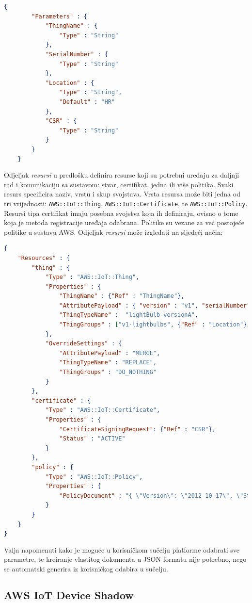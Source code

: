 \begin{lstlisting}[caption={Odjeljak \textit{parametri} u predlošku za registraciju}, language=json]
	{
		"Parameters" : {
			"ThingName" : {
				"Type" : "String"
			},
			"SerialNumber" : {
				"Type" : "String"
			},
			"Location" : {
				"Type" : "String",
				"Default" : "HR"
			},
			"CSR" : {
				"Type" : "String"    
			}
		}
	}
\end{lstlisting}

Odjeljak \textit{resursi} u predlošku definira resurse koji su potrebni uređaju za daljnji rad i komunikaciju sa sustavom: stvar, certifikat, jedna ili više politika. Svaki resurs specificira naziv, vrstu i skup svojstava. Vrsta resursa može biti jedna od tri vrijednosti: \lstinline|AWS::IoT::Thing|, \lstinline|AWS::IoT::Certificate|, te \lstinline|AWS::IoT::Policy|. Resursi tipa certifikat imaju posebna svojstva koja ih definiraju, ovisno o tome koja je metoda registracije uređaja odabrana. Politike su vezane za već postojeće politike u sustavu AWS. Odjeljak \textit{resursi} može izgledati na sljedeći način:

\begin{lstlisting}[caption={Odjeljak \textit{resursi} u predlošku za registraciju}, language=json]
{ 
	"Resources" : {
		"thing" : {
			"Type" : "AWS::IoT::Thing",
			"Properties" : {
				"ThingName" : {"Ref" : "ThingName"},
				"AttributePayload" : { "version" : "v1", "serialNumber" :  {"Ref" : "SerialNumber"}}, 
				"ThingTypeName" :  "lightBulb-versionA",
				"ThingGroups" : ["v1-lightbulbs", {"Ref" : "Location"}]
			},
			"OverrideSettings" : {
				"AttributePayload" : "MERGE",
				"ThingTypeName" : "REPLACE",
				"ThingGroups" : "DO_NOTHING"
			}
		},  
		"certificate" : {
			"Type" : "AWS::IoT::Certificate",
			"Properties" : {
				"CertificateSigningRequest": {"Ref" : "CSR"},
				"Status" : "ACTIVE"      
			}
		},
		"policy" : {
			"Type" : "AWS::IoT::Policy",
			"Properties" : {
				"PolicyDocument" : "{ \"Version\": \"2012-10-17\", \"Statement\": [{ \"Effect\": \"Allow\", \"Action\":[\"iot:Publish\"], \"Resource\": [\"arn:aws:iot:us-east-1:123456789012:topic/foo/bar\"] }] }"
			}
		}
	}
}
\end{lstlisting}

Valja napomenuti kako je moguće u korisničkom sučelju platforme odabrati sve parametre, te kreiranje vlastitog dokumenta u JSON formatu nije potrebno, nego se automatski generira iz korisničkog odabira u sučelju. 

\subsection{AWS IoT Device Shadow}

